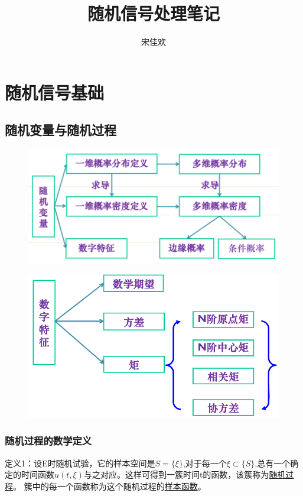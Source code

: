 \documentclass[UTF8]{ctexart} %
\title{随机信号处理笔记}
\author{宋佳欢}
\begin{document}
	\maketitle
	\tableofcontents
	\songti {}
	
	\section{随机信号基础}
		\subsection{随机变量与随机过程}
			\begin{figure}[H]
				\centering\includegraphics[scale=0.35]{1.png}
			\end{figure}
			\begin{figure}[H]
				\centering\includegraphics[scale=0.35]{2.png}
			\end{figure}
		
			\subsubsection{随机过程的数学定义}
			
				定义1：设E时随机试验，它的样本空间是$S=\{\xi\}$,对于每一个$\xi\subset \{S\}$,总有一个确定的时间函数$u(t,\xi)$与之对应。这样可得到一簇时间t的函数，该簇称为\uline{随机过程}。
				簇中的每一个函数称为这个随机过程的\uline{样本函数}。
			
\end{document}
